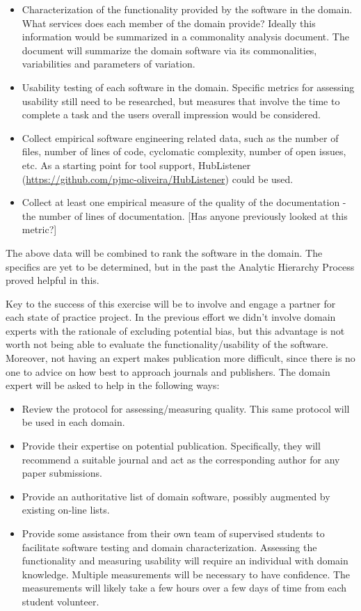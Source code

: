 \documentclass[12pt]{article}
\begin{document}
\begin{itemize}
\item Characterization of the functionality provided by the software in the
  domain.  What services does each member of the domain provide?  Ideally this
  information would be summarized in a commonality analysis document.  The
  document will summarize the domain software via its commonalities,
  variabilities and parameters of variation.
\item Usability testing of each software in the domain.  Specific metrics for
  assessing usability still need to be researched, but measures that involve the
  time to complete a task and the users overall impression would be considered.
\item Collect empirical software engineering related data, such as the number of
  files, number of lines of code, cyclomatic complexity, number of open issues,
  etc.  As a starting point for tool support, HubListener
  (\url{https://github.com/pjmc-oliveira/HubListener}) could be used.
\item Collect at least one empirical measure of the quality of the documentation
  - the number of lines of documentation.  [Has anyone previously looked at this
  metric?]
\end{itemize}

The above data will be combined to rank the software in the domain.  The
specifics are yet to be determined, but in the past the Analytic Hierarchy
Process proved helpful in this.

Key to the success of this exercise will be to involve and engage a partner for
each state of practice project.  In the previous effort we didn't involve domain
experts with the rationale of excluding potential bias, but this advantage is
not worth not being able to evaluate the functionality/usability of the software.
Moreover, not having an expert makes publication more difficult, since there is
no one to advice on how best to approach journals and publishers.  The domain
expert will be asked to help in the following ways:

\begin{itemize}
\item Review the protocol for assessing/measuring quality.  This same protocol
  will be used in each domain.
\item Provide their expertise on potential publication.  Specifically, they will
  recommend a suitable journal and act as the corresponding author for any paper
  submissions. 
\item Provide an authoritative list of domain software, possibly augmented by
  existing on-line lists.
\item Provide some assistance from their own team of supervised students to
  facilitate software testing and domain characterization.  Assessing the
  functionality and measuring usability will require an individual with domain
  knowledge.  Multiple measurements will be necessary to have confidence.  The
  measurements will likely take a few hours over a few days of time from each
  student volunteer.
\end{itemize}
\end{document}
